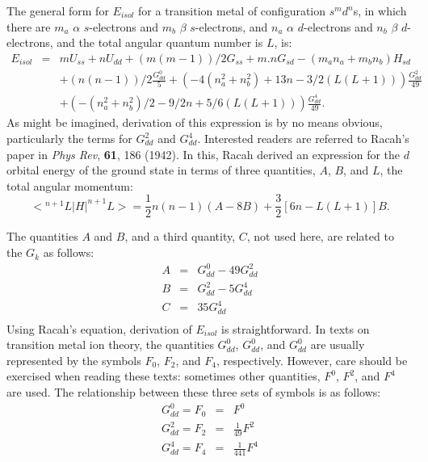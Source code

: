 The general form for $E_{isol}$ for a transition metal of configuration
$s^md^n$s, in which there are $m_a$ $\alpha$ $s$-electrons and $m_b$ $\beta$ 
$s$-electrons, and $n_a$ $\alpha$ $d$-electrons and $n_b$ $\beta$ 
$d$-electrons, and the total angular quantum number is $L$, is:
\begin{eqnarray} \nonumber
E_{isol}&=&mU_{ss}+nU_{dd}+
(m(m-1))/2G_{ss}+m.nG_{sd}-(m_an_a+m_bn_b)H_{sd}\\ \nonumber
&& +(n(n-1))/2\frac{G_{dd}^0}{5} +(-4(n_a^2+n_b^2)+13n-3/2(L(L+1)))\frac{G_{dd}^2}{49}\\ \nonumber 
&& +(-(n_a^2+n_b^2)/2-9/2n+5/6(L(L+1)))\frac{G_{dd}^4}{49}. \nonumber
\end{eqnarray}
As might be imagined, derivation of this expression is by no means  obvious,
particularly the terms for $G_{dd}^2$ and $G_{dd}^4$.  Interested readers are
referred to Racah's paper in {\it Phys Rev}, {\bf 61}, 186 (1942). In this,
Racah derived an expression for the $d$ orbital energy of the ground  state in
terms of three quantities, $A$, $B$, and $L$, the total angular momentum:
$$
<\! ^{n+1}L|H|^{n+1}L>=\frac{1}{2}n(n-1)(A-8B)+\frac{3}{2}[6n-L(L+1)]B.
$$

The quantities $A$ and $B$, and a third quantity, $C$, not used here, are
related  to the $G_k$ as follows:
\begin{eqnarray} \nonumber
A&=&G_{dd}^0-49G_{dd}^2\\ \nonumber
B&=&G_{dd}^2-5G_{dd}^4\\ \nonumber
C&=&35G_{dd}^4 \\ \nonumber
\end{eqnarray}
Using Racah's equation, derivation of  $E_{isol}$ is straightforward.  In texts
on transition metal ion theory, the quantities $G_{dd}^0$, $G_{dd}^0$, and 
$G_{dd}^0$ are usually represented by the symbols $F_0$, $F_2$, and $F_4$,
respectively.  However, care should be exercised when reading these texts:
sometimes other quantities, $F^0$, $F^2$, and $F^4$ are used.  The relationship
between these three sets of symbols is as follows:
\begin{eqnarray}\nonumber
G_{dd}^0  =  F_0 &=& F^0 \\ \nonumber
G_{dd}^2  =  F_2 &=& \frac{1}{49}F^2 \\ \nonumber
G_{dd}^4  =  F_4 &=& \frac{1}{441}F^4 \\ \nonumber
\end{eqnarray}


